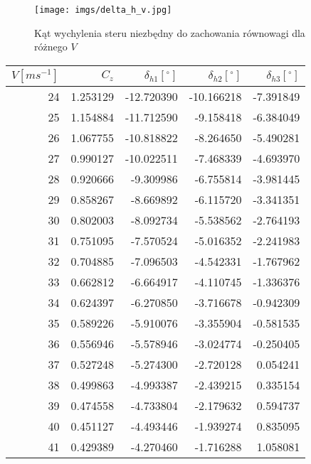\documentclass[12pt]{sprawozdanie}
\begin{document}
\begin{figure}[h!]
    \centering
    \texttt{[image: imgs/delta\_h\_v.jpg]}

    \caption{Kąt wychylenia steru niezbędny do zachowania równowagi dla różnego $V$}
    \label{fig:deltahv}
\end{figure}
\FloatBarrier

\begin{table}[h!]
    \centering
    \begin{tabular}{rrrrr}
        \toprule
        $V [ms^{-1}]$ &   $C_z$ &  $\delta_{h1}[^{\circ}]$ &  $\delta_{h2}[^{\circ}]$ &  $\delta_{h3}[^{\circ}]$ \\
        \midrule
        24  &  1.253129 & -12.720390 & -10.166218 & -7.391849 \\
        25  &  1.154884 & -11.712590 &  -9.158418 & -6.384049 \\
        26  &  1.067755 & -10.818822 &  -8.264650 & -5.490281 \\
        27  &  0.990127 & -10.022511 &  -7.468339 & -4.693970 \\
        28  &  0.920666 &  -9.309986 &  -6.755814 & -3.981445 \\
        29  &  0.858267 &  -8.669892 &  -6.115720 & -3.341351 \\
        30  &  0.802003 &  -8.092734 &  -5.538562 & -2.764193 \\
        31  &  0.751095 &  -7.570524 &  -5.016352 & -2.241983 \\
        32  &  0.704885 &  -7.096503 &  -4.542331 & -1.767962 \\
        33  &  0.662812 &  -6.664917 &  -4.110745 & -1.336376 \\
        34  &  0.624397 &  -6.270850 &  -3.716678 & -0.942309 \\
        35  &  0.589226 &  -5.910076 &  -3.355904 & -0.581535 \\
        36  &  0.556946 &  -5.578946 &  -3.024774 & -0.250405 \\
        37  &  0.527248 &  -5.274300 &  -2.720128 &  0.054241 \\
        38  &  0.499863 &  -4.993387 &  -2.439215 &  0.335154 \\
        39  &  0.474558 &  -4.733804 &  -2.179632 &  0.594737 \\
        40  &  0.451127 &  -4.493446 &  -1.939274 &  0.835095 \\
        41  &  0.429389 &  -4.270460 &  -1.716288 &  1.058081 \\

\end{tabular}
\end{table}
\end{document}
